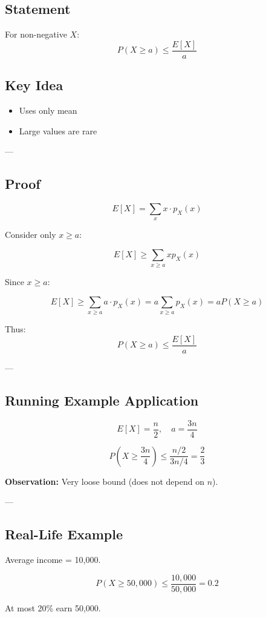 \documentclass[12pt]{article}
\begin{document}
\subsection{Statement}

For non-negative $X$:
\[
P(X \ge a) \le \frac{E[X]}{a}
\]

\subsection{Key Idea}
\begin{itemize}
    \item Uses only mean
    \item Large values are rare
\end{itemize}

---

\subsection{Proof}

\[
E[X] = \sum_{x} x \cdot p_X(x)
\]

Consider only $x \ge a$:

\[
E[X] \ge \sum_{x \ge a} x p_X(x)
\]

Since $x \ge a$:

\[
E[X] \ge \sum_{x \ge a} a \cdot p_X(x)
= a \sum_{x \ge a} p_X(x)
= a P(X \ge a)
\]

Thus:
\[
P(X \ge a) \le \frac{E[X]}{a}
\]

---

\subsection{Running Example Application}

\[
E[X] = \frac{n}{2}, \quad a = \frac{3n}{4}
\]

\[
P\left(X \ge \frac{3n}{4}\right) \le \frac{n/2}{3n/4} = \frac{2}{3}
\]

\textbf{Observation:} Very loose bound (does not depend on $n$).

---

\subsection{Real-Life Example}

Average income = 10,000.

\[
P(X \ge 50,000) \le \frac{10,000}{50,000} = 0.2
\]

At most 20\% earn 50,000.
\end{document}
